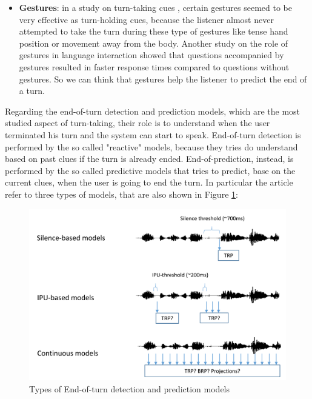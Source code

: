 \documentclass[../main.tex]{subfiles}
\begin{document}
\begin{itemize}
\item \textbf{Gestures}: in a study on turn-taking cues \cite{duncan1972some}, certain gestures seemed to be very effective as turn-holding cues, because the listener almost never attempted to take the turn during these type of gestures like tense hand position or movement away from the body. Another study on the role of gestures in language interaction \cite{holler2018processing} showed that questions accompanied by gestures resulted in faster response times compared to questions without gestures. So we can think that gestures help the listener to predict the end of a turn.

\end{itemize}

Regarding the end-of-turn detection and prediction models, which are the most studied aspect of turn-taking, their role is to understand when the user terminated his turn and the system can start to speak. End-of-turn detection is performed by the so called "reactive" models, because they tries do understand based on past clues if the turn is already ended. End-of-prediction, instead, is performed by the so called predictive models that tries to predict, base on the current clues, when the user is going to end the turn. In particular the article refer to three types of models, that are also shown in Figure \ref{fig:models}: 

\begin{figure}[ht]
    \centering
    \includegraphics[width=\textwidth]{images/Turn-taking_models.png}
    \caption{Types of End-of-turn detection and prediction models \cite{skantze2021turn}}
    \label{fig:models}
\end{figure}
\end{document}
